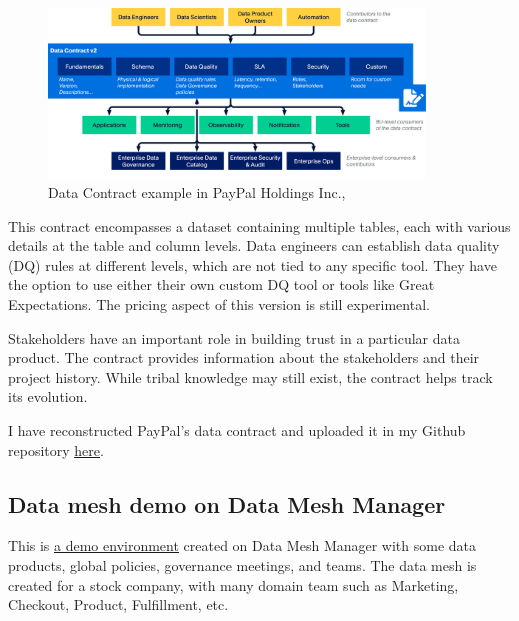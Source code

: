 \documentclass[12pt, a4paper]{book}
\begin{document}
\begin{figure}[h]
	\begin{framed}
		\centering
		\includegraphics[width=10cm]{datacontractPayPal.png}
		\caption{Data Contract example in PayPal Holdings Inc.,}
		\label{DataContractPayPal}
	\end{framed}
\end{figure}

This contract encompasses a dataset containing multiple tables, each with various details at the table and column levels. Data engineers can establish data quality (DQ) rules at different levels, which are not tied to any specific tool. They have the option to use either their own custom DQ tool or tools like Great Expectations. The pricing aspect of this version is still experimental.

Stakeholders have an important role in building trust in a particular data product. The contract provides information about the stakeholders and their project history. While tribal knowledge may still exist, the contract helps track its evolution.

I have reconstructed PayPal's data contract and uploaded it in my Github repository \href{https://github.com/ngocminhta/DataMeshReport/tree/main/DataContractPayPal.md}{\underline{here}}.

\subsection{Data mesh demo on Data Mesh Manager}
This is \href{https://demo.datamesh-manager.com/}{\underline{a demo environment}} created on Data Mesh Manager with some data products, global policies, governance meetings, and teams. The data mesh is created for a stock company, with many domain team such as Marketing, Checkout, Product, Fulfillment, etc.
\end{document}
